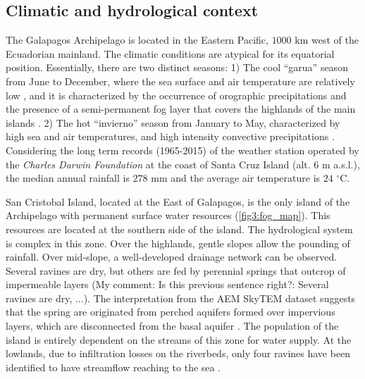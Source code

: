 \documentclass[a4paper,12pt]{article}
\begin{document}
\begin{linenumbers}
\subsection{Climatic and hydrological context}
The Galapagos Archipelago is located in the Eastern Pacific, $1000$ $\mathrm{km}$ west of the Ecuadorian mainland. The climatic conditions are atypical for its equatorial position. Essentially, there are two distinct seasons: 1) The cool “garua” season from June to December, where the sea surface and air temperature are relatively low \citep{PalmerandPyle1966, Dunbaretal1994}, and it is characterized by the occurrence of orographic precipitations and the presence of a semi-permanent fog layer that covers the highlands of the main islands \citep{TruemananddOzouville2010, Pryetetal2012a}. 2) The hot “invierno” season from January to May, characterized by high sea and air temperatures, and high intensity convective precipitations \citep{GrantandBoag1980, Dunbaretal1994, TruemananddOzouville2010}. Considering the long term records (1965-2015) of the weather station operated by the \emph{Charles Darwin Foundation} at the coast of Santa Cruz Island (alt. $6$ $\mathrm{m}$ a.s.l.), the median annual rainfall is $278$ $\mathrm{mm}$ and the average air temperature is $24$ $\mathrm{^{\circ}C}$.

San Cristobal Island, located at the East of Galapagos, is the only island of the Archipelago with permanent surface water resources (\autoref{fig3:fog_map}). This resources are located at the southern side of the island. The hydrological system is complex in this zone. Over the highlands, gentle slopes allow the pounding of rainfall. Over mid-slope, a well-developed drainage network can be observed. Several ravines are dry, but others are fed by perennial springs that outcrop of impermeable layers (My comment: Is this previous sentence right?: Several ravines are dry, ...). The interpretation from the AEM SkyTEM dataset \cite{dOzouville2007} suggests that the spring are originated from perched aquifers formed over impervious layers, which are disconnected from the basal aquifer \citep{Pryetetal2012b, Violetteetal2014}. The population of the island is entirely dependent on the streams of this zone for water supply. At the lowlands, due to infiltration losses on the riverbeds, only four ravines have been identified to have streamflow reaching to the sea \citep{dOzouville2007}. 


\end{linenumbers}
\end{document}
